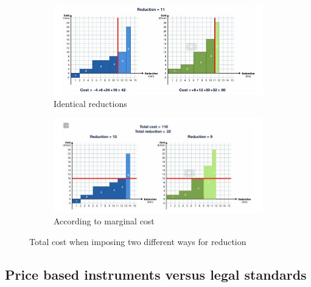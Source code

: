 \documentclass[../summary.tex]{subfiles}
\begin{document}
	  \begin{figure}[htbp]
	  	\centering
	  	\begin{subfigure}{.5\textwidth}
	  		\centering
	  		\includegraphics[width=1\linewidth]{images/10-identical-reduction-for-companies.png}
	  		\caption{Identical reductions}
	  		\label{fig:reduction-identical}
	  	\end{subfigure}%
	  	\begin{subfigure}{.5\textwidth}
	  		\centering
	  		\includegraphics[width=1\linewidth]{images/10-reduction-based-on-marginal-cost.png}
	  		\caption{According to marginal cost}
	  		\label{fig:reduction-marginal-cost}
	  	\end{subfigure}
	  	\caption{Total cost when imposing two different ways for reduction}
	  	\label{fig:reduction}
	  \end{figure}
	  \newpage
	  \subsection{Price based instruments versus legal standards}
	  
\end{document}
